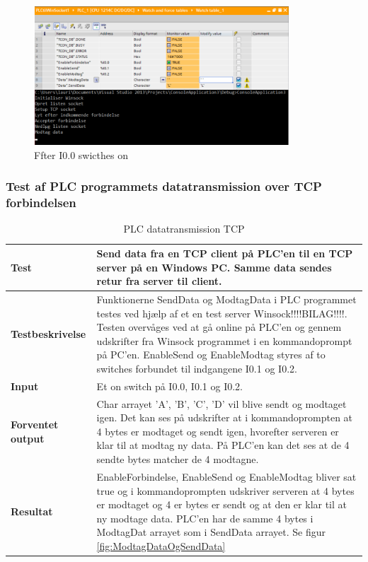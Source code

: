 \begin{figure}[H] %
	\centering
	\includegraphics[width=0.85\textwidth]{Test/ModultestStyringsenhed/OpretForbindelseEfter}
	\caption{Ffter I0.0 swicthes on}
	\label{fig:OpretForbindelseEfter}
\end{figure}

\subsubsection{Test af PLC programmets datatransmission over TCP forbindelsen}

\begin{table}[H]
	\centering
	\begin{tabular}{ | m{} | m{}|} 
		\hline
		\textbf{Test}					&Send data fra en TCP client på PLC'en til en TCP server på en Windows PC. Samme data sendes retur fra server til client. \\ \hline
		\textbf{Testbeskrivelse}		&Funktionerne SendData og ModtagData i PLC programmet testes ved hjælp af et en test server Winsock!!!!BILAG!!!!. Testen overvåges ved at gå online på PLC'en og gennem udskrifter fra Winsock programmet i en kommandoprompt på PC'en. EnableSend og EnableModtag styres af to switches forbundet til indgangene I0.1 og I0.2. \\ \hline
		\textbf{Input}					& Et on switch på I0.0, I0.1 og I0.2.\\ \hline
		\textbf{Forventet output}		&Char arrayet 'A', 'B', 'C', 'D' vil blive sendt og modtaget igen. Det kan ses på udskrifter at i kommandoprompten at 4 bytes er modtaget og sendt igen, hvorefter serveren er klar til at modtag ny data. På PLC'en kan det ses at de 4 sendte bytes matcher de 4 modtagne.\\ \hline
		\textbf{Resultat}				&EnableForbindelse, EnableSend og EnableModtag bliver sat true og i kommandoprompten udskriver serveren at 4 bytes er modtaget og 4 er bytes er sendt og at den er klar til at ny modtage data. PLC'en har de samme 4 bytes i ModtagDat arrayet som i SendData arrayet. Se figur \ref{fig:ModtagDataOgSendData} \\ \hline
	\end{tabular}
	\caption{PLC datatransmission TCP} 
	\label{tab:PLCTCP}
\end{table}

